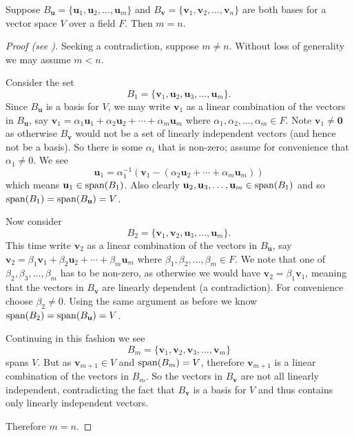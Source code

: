 \begin{theorem}\label{thrm-dimension-theorem-for-finite-bases}
    Suppose $B_\textbf{u} = \{\textbf{u}_1, \textbf{u}_2, \dots, \textbf{u}_m\}$ and $B_\textbf{v} = \{\textbf{v}_1, \textbf{v}_2, \dots, \textbf{v}_n\}$ are both bases for a vector space $V$ over a field $F$. Then $m = n$.
\end{theorem}
\begin{proof}[Proof (see {\cite[Theorem 19.1]{gallian_2016}})]
    Seeking a contradiction, suppose $m \neq n$. Without loss of generality we may assume $m < n$.

    Consider the set
    \[
        B_1 = \{\textbf{v}_1, \textbf{u}_2, \textbf{u}_3, \dots, \textbf{u}_m\}.
    \]
    Since $B_\textbf{u}$ is a basis for $V$, we may write $\textbf{v}_1$ as a linear combination of the vectors in $B_\textbf{u}$, say $\textbf{v}_1 = \alpha_1\textbf{u}_1 + \alpha_2\textbf{u}_2 + \cdots + \alpha_m\textbf{u}_m$ where $\alpha_1, \alpha_2, \dots, \alpha_m \in F$. Note $\textbf{v}_1 \neq \textbf{0}$ as otherwise $B_\textbf{v}$ would not be a set of linearly independent vectors (and hence not be a basis). So there is some $\alpha_i$ that is non-zero; assume for convenience that $\alpha_1 \neq 0$. We see
    \[
        \textbf{u}_1 = \alpha_1^{-1}\left(\textbf{v}_1 - \left(\alpha_2\textbf{u}_2 + \cdots + \alpha_m\textbf{u}_m\right)\right)
    \]
    which means $\textbf{u}_1 \in \mathrm{span}(B_1)$. Also clearly $\textbf{u}_2, \textbf{u}_3, \dots, \textbf{u}_m \in \mathrm{span}(B_1)$ and so $\mathrm{span}(B_1) = \mathrm{span}(B_\textbf{u}) = V$.

    Now consider
    \[
        B_2 = \{\textbf{v}_1, \textbf{v}_2, \textbf{u}_3, \dots, \textbf{u}_m\}.
    \]
    This time write $\textbf{v}_2$ as a linear combination of the vectors in $B_\textbf{u}$, say $\textbf{v}_2 = \beta_1\textbf{v}_1 + \beta_2\textbf{u}_2 + \cdots + \beta_m\textbf{u}_m$ where $\beta_1, \beta_2, \dots, \beta_m \in F$. We note that one of $\beta_2, \beta_3, \dots, \beta_m$ has to be non-zero, as otherwise we would have $\textbf{v}_2 = \beta_1\textbf{v}_1$, meaning that the vectors in $B_\textbf{v}$ are linearly dependent (a contradiction). For convenience choose $\beta_2 \neq 0$. Using the same argument as before we know $\mathrm{span}(B_2) = \mathrm{span}(B_\textbf{u}) = V$.

    Continuing in this fashion we see
    \[
        B_m = \{\textbf{v}_1, \textbf{v}_2, \textbf{v}_3, \dots, \textbf{v}_m\}
    \]
    spans $V$. But as $\textbf{v}_{m+1} \in V$ and $\mathrm{span}(B_m) = V$, therefore $\textbf{v}_{m+1}$ is a linear combination of the vectors in $B_m$. So the vectors in $B_\textbf{v}$ are not all linearly independent, contradicting the fact that $B_\textbf{v}$ is a basis for $V$ and thus contains only linearly independent vectors.

    Therefore $m = n$.
\end{proof}

